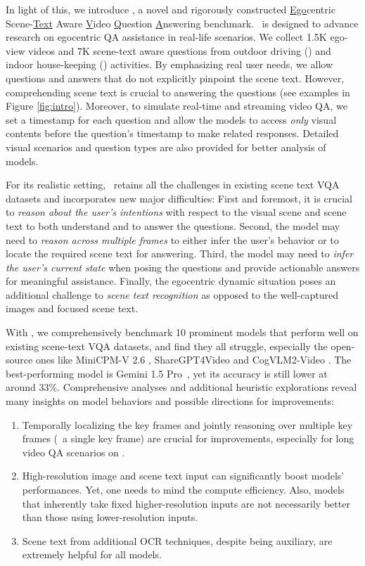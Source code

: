 In light of this, we introduce \dataset, a novel and rigorously constructed \underline{Ego}centric Scene-\underline{Text} Aware \underline{V}ideo \underline{Q}uestion \underline{A}nswering benchmark. \dataset ~is designed to advance research on egocentric QA assistance in real-life scenarios. We collect 1.5K ego-view videos and 7K scene-text aware questions from outdoor driving (\datasetout) and indoor house-keeping (\datasetin) activities. By emphasizing real user needs, we allow questions and answers that do not explicitly pinpoint the scene text. However, comprehending scene text is crucial to answering the questions (see examples in Figure \ref{fig:intro}). Moreover, to simulate real-time and streaming video QA, we set a timestamp for each question and allow the models to access \emph{only} visual contents before the question's timestamp to make related responses. Detailed visual scenarios and question types are also provided for better analysis of models.

For its realistic setting, \dataset~retains all the challenges in existing scene text VQA datasets and incorporates new major difficulties: First and foremost, it is crucial to \emph{reason about the user's intentions} with respect to the visual scene and scene text to both understand and to answer the questions. 
Second, the model may need to \emph{reason across multiple frames} to either infer the user's behavior or to locate the required scene text for answering. 
Third, the model may need to \emph{infer the user's current state} when posing the questions and provide actionable answers for meaningful assistance. Finally, the egocentric dynamic situation poses an additional challenge to \emph{scene text recognition} as opposed to the well-captured images and focused scene text.

With \dataset, we comprehensively benchmark 10 prominent models that perform well on existing scene-text VQA datasets, and find they all struggle, especially the open-source ones like MiniCPM-V 2.6 \cite{yao2024minicpm}, ShareGPT4Video \cite{chen2024sharegpt4video} and CogVLM2-Video \cite{hong2024cogvlm2}. The best-performing model is Gemini 1.5 Pro~\cite{reid2024gemini}, yet its accuracy is still lower at around 33\%. Comprehensive analyses and additional heuristic explorations reveal many insights on model behaviors and possible directions for improvements: 
\begin{enumerate}
    \item Temporally localizing the key frames and jointly reasoning over multiple key frames (\vs~a single key frame) are crucial for improvements, especially for long video QA scenarios on \datasetin.
    \item High-resolution image and scene text input can significantly boost models' performances. Yet, one needs to mind the compute efficiency. Also, models that inherently take fixed higher-resolution inputs are not necessarily better than those using lower-resolution inputs.
    \item Scene text from additional OCR techniques, despite being auxiliary, are extremely helpful for all models. 
\end{enumerate}

